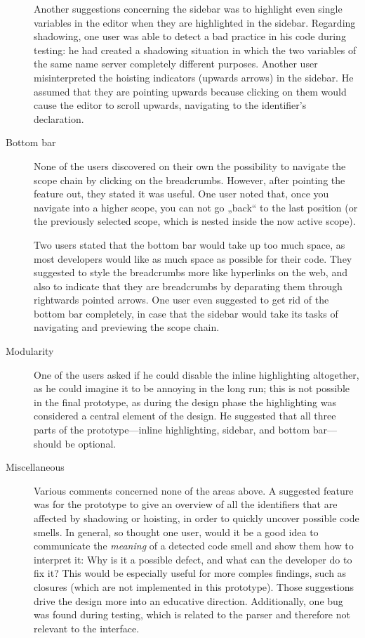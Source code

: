 \begin{description}
Another suggestions concerning the sidebar was to highlight even single
variables in the editor when they are highlighted in the sidebar.
Regarding shadowing, one user was able to detect a bad practice in his
code during testing: he had created a shadowing situation in which the
two variables of the same name server completely different purposes.
Another user misinterpreted the hoisting indicators (upwards arrows) in
the sidebar. He assumed that they are pointing upwards because clicking
on them would cause the editor to scroll upwards, navigating to the
identifier’s declaration.
\item[Bottom bar]
None of the users discovered on their own the possibility to navigate
the scope chain by clicking on the breadcrumbs. However, after pointing
the feature out, they stated it was useful. One user noted that, once
you navigate into a higher scope, you can not go „back“ to the last
position (or the previously selected scope, which is nested inside the
now active scope).

Two users stated that the bottom bar would take up too much space, as
most developers would like as much space as possible for their code.
They suggested to style the breadcrumbs more like hyperlinks on the web,
and also to indicate that they are breadcrumbs by deparating them
through rightwards pointed arrows. One user even suggested to get rid of
the bottom bar completely, in case that the sidebar would take its tasks
of navigating and previewing the scope chain.
\item[Modularity]
One of the users asked if he could disable the inline highlighting
altogether, as he could imagine it to be annoying in the long run; this
is not possible in the final prototype, as during the design phase the
highlighting was considered a central element of the design. He
suggested that all three parts of the prototype—inline highlighting,
sidebar, and bottom bar—should be optional.
\item[Miscellaneous]
Various comments concerned none of the areas above. A suggested feature
was for the prototype to give an overview of all the identifiers that
are affected by shadowing or hoisting, in order to quickly uncover
possible code smells. In general, so thought one user, would it be a
good idea to communicate the \emph{meaning} of a detected code smell and
show them how to interpret it: Why is it a possible defect, and what can
the developer do to fix it? This would be especially useful for more
comples findings, such as closures (which are not implemented in this
prototype). Those suggestions drive the design more into an educative
direction. Additionally, one bug was found during testing, which is
related to the parser and therefore not relevant to the interface.
\end{description}

